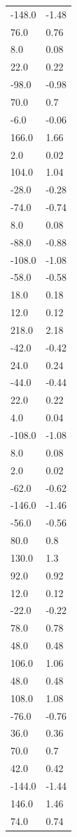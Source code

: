 \begin{longtable}{ll}
-148.0 & -1.48 \\
76.0 & 0.76 \\
8.0 & 0.08 \\
22.0 & 0.22 \\
-98.0 & -0.98 \\
70.0 & 0.7 \\
-6.0 & -0.06 \\
166.0 & 1.66 \\
2.0 & 0.02 \\
104.0 & 1.04 \\
-28.0 & -0.28 \\
-74.0 & -0.74 \\
8.0 & 0.08 \\
-88.0 & -0.88 \\
-108.0 & -1.08 \\
-58.0 & -0.58 \\
18.0 & 0.18 \\
12.0 & 0.12 \\
218.0 & 2.18 \\
-42.0 & -0.42 \\
24.0 & 0.24 \\
-44.0 & -0.44 \\
22.0 & 0.22 \\
4.0 & 0.04 \\
-108.0 & -1.08 \\
8.0 & 0.08 \\
2.0 & 0.02 \\
-62.0 & -0.62 \\
-146.0 & -1.46 \\
-56.0 & -0.56 \\
80.0 & 0.8 \\
130.0 & 1.3 \\
92.0 & 0.92 \\
12.0 & 0.12 \\
-22.0 & -0.22 \\
78.0 & 0.78 \\
48.0 & 0.48 \\
106.0 & 1.06 \\
48.0 & 0.48 \\
108.0 & 1.08 \\
-76.0 & -0.76 \\
36.0 & 0.36 \\
70.0 & 0.7 \\
42.0 & 0.42 \\
-144.0 & -1.44 \\
146.0 & 1.46 \\
74.0 & 0.74 \\

\end{longtable}
